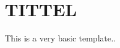 \documentclass[12pt]{article}
\newcommand{\br}{\vspace{12pt}}
\begin{document}
\section*{\centering TITTEL}
\br

This is a very basic template..
\end{document}
